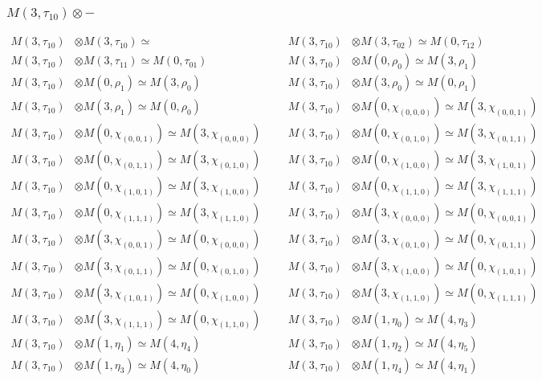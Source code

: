 \subsubsection{$ M(3,\tau_{10})\otimes -$}
\begin{align*}
M(3,\tau_{10}) &\otimes M(3,\tau_{10}) \simeq  &&& M(3,\tau_{10}) &\otimes M(3,\tau_{02}) \simeq M(0,\tau_{12})\\
M(3,\tau_{10}) &\otimes M(3,\tau_{11}) \simeq M(0,\tau_{01}) &&& M(3,\tau_{10}) &\otimes M(0,\rho_{0}) \simeq M(3,\rho_{1})\\
M(3,\tau_{10}) &\otimes M(0,\rho_{1}) \simeq M(3,\rho_{0}) &&& M(3,\tau_{10}) &\otimes M(3,\rho_{0}) \simeq M(0,\rho_{1})\\
M(3,\tau_{10}) &\otimes M(3,\rho_{1}) \simeq M(0,\rho_{0}) &&& M(3,\tau_{10}) &\otimes M(0,\chi_{(0,0,0)}) \simeq M(3,\chi_{(0,0,1)})\\
M(3,\tau_{10}) &\otimes M(0,\chi_{(0,0,1)}) \simeq M(3,\chi_{(0,0,0)}) &&& M(3,\tau_{10}) &\otimes M(0,\chi_{(0,1,0)}) \simeq M(3,\chi_{(0,1,1)})\\
M(3,\tau_{10}) &\otimes M(0,\chi_{(0,1,1)}) \simeq M(3,\chi_{(0,1,0)}) &&& M(3,\tau_{10}) &\otimes M(0,\chi_{(1,0,0)}) \simeq M(3,\chi_{(1,0,1)})\\
M(3,\tau_{10}) &\otimes M(0,\chi_{(1,0,1)}) \simeq M(3,\chi_{(1,0,0)}) &&& M(3,\tau_{10}) &\otimes M(0,\chi_{(1,1,0)}) \simeq M(3,\chi_{(1,1,1)})\\
M(3,\tau_{10}) &\otimes M(0,\chi_{(1,1,1)}) \simeq M(3,\chi_{(1,1,0)}) &&& M(3,\tau_{10}) &\otimes M(3,\chi_{(0,0,0)}) \simeq M(0,\chi_{(0,0,1)})\\
M(3,\tau_{10}) &\otimes M(3,\chi_{(0,0,1)}) \simeq M(0,\chi_{(0,0,0)}) &&& M(3,\tau_{10}) &\otimes M(3,\chi_{(0,1,0)}) \simeq M(0,\chi_{(0,1,1)})\\
M(3,\tau_{10}) &\otimes M(3,\chi_{(0,1,1)}) \simeq M(0,\chi_{(0,1,0)}) &&& M(3,\tau_{10}) &\otimes M(3,\chi_{(1,0,0)}) \simeq M(0,\chi_{(1,0,1)})\\
M(3,\tau_{10}) &\otimes M(3,\chi_{(1,0,1)}) \simeq M(0,\chi_{(1,0,0)}) &&& M(3,\tau_{10}) &\otimes M(3,\chi_{(1,1,0)}) \simeq M(0,\chi_{(1,1,1)})\\
M(3,\tau_{10}) &\otimes M(3,\chi_{(1,1,1)}) \simeq M(0,\chi_{(1,1,0)}) &&& M(3,\tau_{10}) &\otimes M(1,\eta_{0}) \simeq M(4,\eta_{3})\\
M(3,\tau_{10}) &\otimes M(1,\eta_{1}) \simeq M(4,\eta_{4}) &&& M(3,\tau_{10}) &\otimes M(1,\eta_{2}) \simeq M(4,\eta_{5})\\
M(3,\tau_{10}) &\otimes M(1,\eta_{3}) \simeq M(4,\eta_{0}) &&& M(3,\tau_{10}) &\otimes M(1,\eta_{4}) \simeq M(4,\eta_{1})\\

\end{align*}
